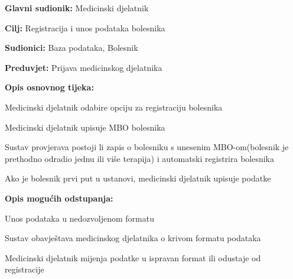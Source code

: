 				
				\noindent {}
				\begin{packed_item}
					
					\item \textbf{Glavni sudionik: }Medicinski djelatnik
					\item  \textbf{Cilj:} Registracija i unos podataka bolesnika
					\item  \textbf{Sudionici:} Baza podataka, Bolesnik
					\item  \textbf{Preduvjet:} Prijava medicinskog djelatnika
					\item  \textbf{Opis osnovnog tijeka:}
					
					
					\item[] \begin{packed_enum}
						
						\item Medicinski djelatnik odabire opciju za registraciju bolesnika
						\item Medicinski djelatnik upisuje MBO bolesnika
						\item Sustav provjerava postoji li zapis o bolesniku s unesenim MBO-om(bolesnik je prethodno odradio jednu ili više terapija)
						i automatski registrira bolesnika
						\item Ako je bolesnik prvi put u ustanovi, medicinski djelatnik upisuje podatke
						
					\end{packed_enum}
					
					\item  \textbf{Opis mogućih odstupanja:}
				\item[2.a] Unos podataka u nedozvoljenom formatu
				\item[] \begin{packed_enum}
					
					\item Sustav obavještava medicinskog djelatnika o krivom formatu podataka
					\item Medicinski djelatnik mijenja podatke u ispravan format ili odustaje od registracije
					
					\end{packed_enum}
				\end{packed_item}
			
